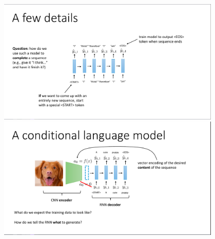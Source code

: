 \documentclass{book}
\begin{document}
\begin{figure}[H]
    \centering
    \includegraphics[width=0.95\textwidth]{images/lec11_1.png}
    \includegraphics[width=0.95\textwidth]{images/lec11_2.png}
\end{figure}
\end{document}
